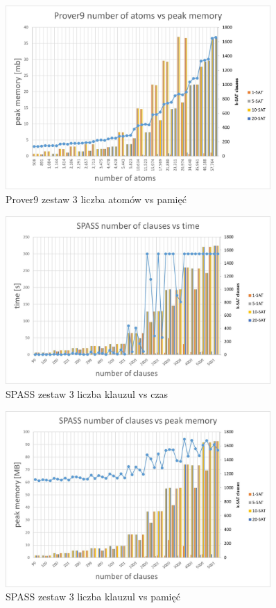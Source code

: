 \documentclass[a4paper,12pt]{article}
\begin{document}
\begin{figure}[H]
  \centerline{\includegraphics[width=0.9\textwidth]{outputs/set3/set3 charts/04 Prover9 number of atoms vs peak memory.jpg}}
  \caption{Prover9 zestaw 3 liczba atomów vs pamięć}
\end{figure}


\begin{figure}[H]
  \centerline{\includegraphics[width=0.9\textwidth]{outputs/set3/set3 charts/11 SPASS number of clauses vs time.jpg}}
  \caption{SPASS zestaw 3 liczba klauzul vs czas}
\end{figure}

\begin{figure}[H]
  \centerline{\includegraphics[width=0.9\textwidth]{outputs/set3/set3 charts/12 SPASS number of clauses vs peak memory.jpg}}
  \caption{SPASS zestaw 3 liczba klauzul vs pamięć}
\end{figure}
\end{document}

